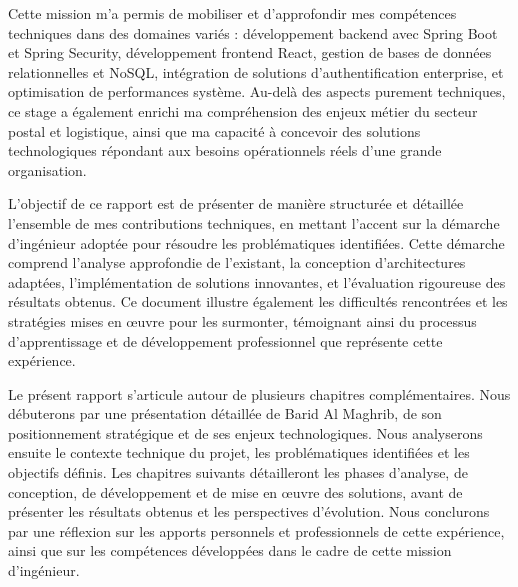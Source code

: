 Cette mission m'a permis de mobiliser et d'approfondir mes compétences techniques dans des domaines variés : développement backend avec Spring Boot et Spring Security, développement frontend React, gestion de bases de données relationnelles et NoSQL, intégration de solutions d'authentification enterprise, et optimisation de performances système. Au-delà des aspects purement techniques, ce stage a également enrichi ma compréhension des enjeux métier du secteur postal et logistique, ainsi que ma capacité à concevoir des solutions technologiques répondant aux besoins opérationnels réels d'une grande organisation.

L'objectif de ce rapport est de présenter de manière structurée et détaillée l'ensemble de mes contributions techniques, en mettant l'accent sur la démarche d'ingénieur adoptée pour résoudre les problématiques identifiées. Cette démarche comprend l'analyse approfondie de l'existant, la conception d'architectures adaptées, l'implémentation de solutions innovantes, et l'évaluation rigoureuse des résultats obtenus. Ce document illustre également les difficultés rencontrées et les stratégies mises en œuvre pour les surmonter, témoignant ainsi du processus d'apprentissage et de développement professionnel que représente cette expérience.

Le présent rapport s'articule autour de plusieurs chapitres complémentaires. Nous débuterons par une présentation détaillée de Barid Al Maghrib, de son positionnement stratégique et de ses enjeux technologiques. Nous analyserons ensuite le contexte technique du projet, les problématiques identifiées et les objectifs définis. Les chapitres suivants détailleront les phases d'analyse, de conception, de développement et de mise en œuvre des solutions, avant de présenter les résultats obtenus et les perspectives d'évolution. Nous conclurons par une réflexion sur les apports personnels et professionnels de cette expérience, ainsi que sur les compétences développées dans le cadre de cette mission d'ingénieur.